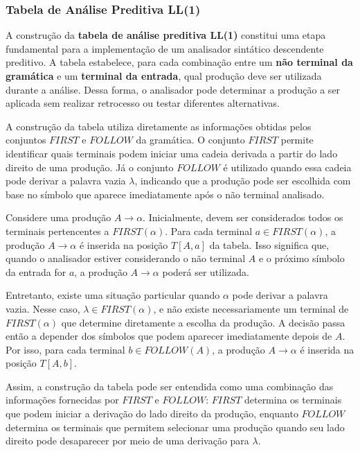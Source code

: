 \documentclass[
  brazilian,
  letterpaper,
]{book}
\theoremstyle{plain}
\theoremstyle{definition}
\theoremstyle{remark}
\begin{document}
\subsubsection{Tabela de Análise Preditiva
LL(1)}\label{tabela-de-anuxe1lise-preditiva-ll1}

A construção da \textbf{tabela de análise preditiva LL(1)} constitui uma
etapa fundamental para a implementação de um analisador sintático
descendente preditivo. A tabela estabelece, para cada combinação entre
um \textbf{não terminal da gramática} e um \textbf{terminal da entrada},
qual produção deve ser utilizada durante a análise. Dessa forma, o
analisador pode determinar a produção a ser aplicada sem realizar
retrocesso ou testar diferentes alternativas.

A construção da tabela utiliza diretamente as informações obtidas pelos
conjuntos \textbf{\(FIRST\)} e \textbf{\(FOLLOW\)} da gramática. O
conjunto \(FIRST\) permite identificar quais terminais podem iniciar uma
cadeia derivada a partir do lado direito de uma produção. Já o conjunto
\(FOLLOW\) é utilizado quando essa cadeia pode derivar a palavra vazia
\(\lambda\), indicando que a produção pode ser escolhida com base no
símbolo que aparece imediatamente após o não terminal analisado.

Considere uma produção \(A\rightarrow\alpha\). Inicialmente, devem ser
considerados todos os terminais pertencentes a \(FIRST(\alpha)\). Para
cada terminal \(a\in FIRST(\alpha)\), a produção \(A\rightarrow\alpha\)
é inserida na posição \(T[A,a]\) da tabela. Isso significa que, quando o
analisador estiver considerando o não terminal \(A\) e o próximo símbolo
da entrada for \(a\), a produção \(A\rightarrow\alpha\) poderá ser
utilizada.

Entretanto, existe uma situação particular quando \(\alpha\) pode
derivar a palavra vazia. Nesse caso, \(\lambda\in FIRST(\alpha)\), e não
existe necessariamente um terminal de \(FIRST(\alpha)\) que determine
diretamente a escolha da produção. A decisão passa então a depender dos
símbolos que podem aparecer imediatamente depois de \(A\). Por isso,
para cada terminal \(b\in FOLLOW(A)\), a produção \(A\rightarrow\alpha\)
é inserida na posição \(T[A,b]\).

Assim, a construção da tabela pode ser entendida como uma combinação das
informações fornecidas por \(FIRST\) e \(FOLLOW\): \textbf{\(FIRST\)}
determina os terminais que podem iniciar a derivação do lado direito da
produção, enquanto \textbf{\(FOLLOW\)} determina os terminais que
permitem selecionar uma produção quando seu lado direito pode
desaparecer por meio de uma derivação para \(\lambda\).
\end{document}

